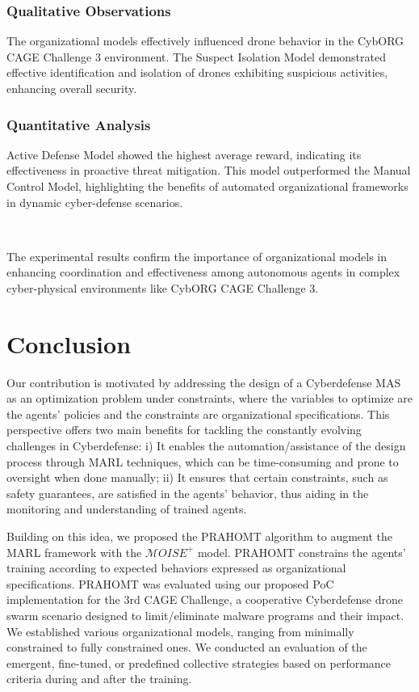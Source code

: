 \documentclass[conference]{IEEEtran}
\begin{document}
\subsubsection{Qualitative Observations}

The organizational models effectively influenced drone behavior in the CybORG CAGE Challenge 3 environment. The Suspect Isolation Model demonstrated effective identification and isolation of drones exhibiting suspicious activities, enhancing overall security.

\subsubsection{Quantitative Analysis}

{Active Defense Model} showed the highest average reward, indicating its effectiveness in proactive threat mitigation. This model outperformed the Manual Control Model, highlighting the benefits of automated organizational frameworks in dynamic cyber-defense scenarios.

\

The experimental results confirm the importance of organizational models in enhancing coordination and effectiveness among autonomous agents in complex cyber-physical environments like CybORG CAGE Challenge 3.



\section{Conclusion}\label{sec:conclusion}

Our contribution is motivated by addressing the design of a Cyberdefense MAS as an optimization problem under constraints, where the variables to optimize are the agents' policies and the constraints are organizational specifications. This perspective offers two main benefits for tackling the constantly evolving challenges in Cyberdefense: i) It enables the automation/assistance of the design process through MARL techniques, which can be time-consuming and prone to oversight when done manually; ii) It ensures that certain constraints, such as safety guarantees, are satisfied in the agents' behavior, thus aiding in the monitoring and understanding of trained agents.

Building on this idea, we proposed the PRAHOMT algorithm to augment the MARL framework with the $\mathcal{M}OISE^+$ model. PRAHOMT constrains the agents' training according to expected behaviors expressed as organizational specifications. PRAHOMT was evaluated using our proposed PoC implementation for the 3rd CAGE Challenge, a cooperative Cyberdefense drone swarm scenario designed to limit/eliminate malware programs and their impact. We established various organizational models, ranging from minimally constrained to fully constrained ones. We conducted an evaluation of the emergent, fine-tuned, or predefined collective strategies based on performance criteria during and after the training.
\end{document}
